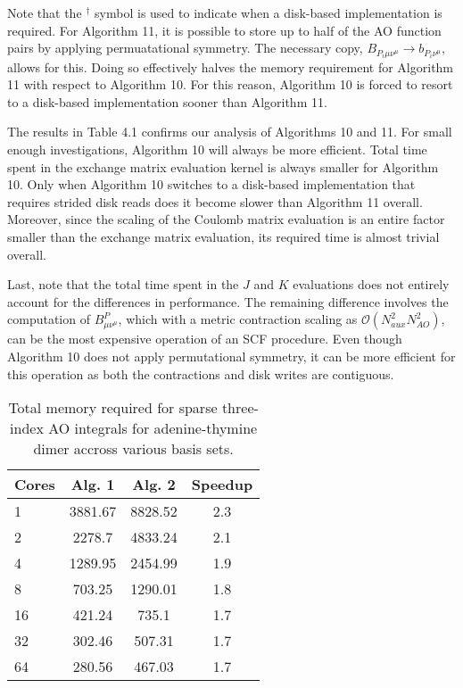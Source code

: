 Note that the $^{\dagger}$ symbol is used to indicate when a disk-based implementation is required. For Algorithm 11, it is possible
to store up to half of the AO function pairs by applying permuatational symmetry. The necessary copy, 
$B_{P_i \mu \nu^{\mu}} \rightarrow b_{P_i \nu^{\mu}}$, allows for this. Doing so effectively halves the memory requirement for Algorithm 11
with respect to Algorithm 10. For this reason, Algorithm 10 is forced to resort to a disk-based implementation sooner than Algorithm 11.

The results in Table 4.1 confirms our analysis of Algorithms 10 and 11. For small enough investigations, Algorithm 10 will always be more
efficient. Total time spent in the exchange matrix evaluation kernel is always smaller for Algorithm 10. Only when Algorithm 10 switches to 
a disk-based implementation that requires strided disk reads does it become slower than Algorithm 11 overall. Moreover, since the scaling of
the Coulomb matrix evaluation is an entire factor smaller than the exchange matrix evaluation, its required time is almost trivial overall.

Last, note that the total time spent in the $J$ and $K$ evaluations does not entirely account for the differences in performance. The 
remaining difference involves the computation of $B^P_{\mu \nu^\mu}$, which with a metric contraction scaling as 
$\mathcal{O}(N_{aux}^2N_{AO}^2)$, can be the most expensive operation of an SCF procedure. Even though Algorithm 10 does not 
apply permutational symmetry, it can be more efficient for this operation as both the contractions and disk writes are contiguous.




\begingroup
\begin{table}[H]
\centering
\renewcommand{\baselinestretch}{1}
\caption{Total memory required for sparse three-index AO integrals for adenine-thymine dimer accross various basis sets.}
\begin{tabular}{l ccc}
\multicolumn{1}{l}{\textbf{Cores}} &
\multicolumn{1}{c}{\textbf{Alg. 1}} &
\multicolumn{1}{c}{\textbf{Alg. 2}} &
\multicolumn{1}{c}{\textbf{Speedup}} \\
\hline

1   &3881.67&   8828.52 &2.3 \\
2   &2278.7 &   4833.24 &2.1 \\
4   &1289.95&   2454.99 &1.9 \\
8   &703.25&    1290.01 &1.8 \\
16  &421.24&    735.1   &1.7 \\
32  &302.46&    507.31  &1.7 \\
64  &280.56&    467.03  &1.7 \\

\end{tabular}
\end{table}
\endgroup


